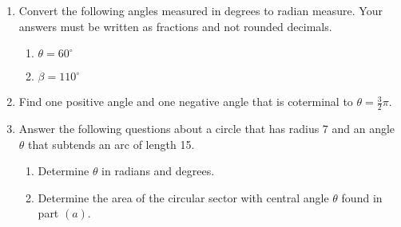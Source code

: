 

\begin{enumerate}
\item  Convert the following angles measured in degrees to radian measure.  Your answers must be written as fractions and not rounded decimals.
\begin{enumerate}
\item $\theta=60^\circ$\vfill
\item $\beta=110^\circ$\vfill

\end{enumerate}

\item  Find one positive angle and one negative angle that is coterminal to $\displaystyle \theta=\frac{3}{2}\pi$.\vfill

\newpage

\item Answer the following questions about a circle that has radius 7 and an angle $\theta$ that subtends an arc of length 15.
\begin{enumerate}
\item Determine $\theta$ in radians and degrees.\vfill
\item Determine the area of the circular sector with central angle $\theta$ found in part $(a)$.\vfill
\end{enumerate}


\end{enumerate}



